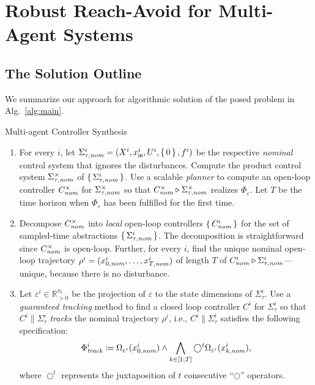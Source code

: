 \section{Robust Reach-Avoid for Multi-Agent Systems}
\subsection{The Solution Outline}
We summarize our approach for algorithmic solution of the posed problem in Alg.~\ref{alg:main}.

\begin{algorithm}
	\caption{Multi-agent Controller Synthesis}
	\label{alg:main}
	\begin{enumerate}
		\item For every $i$, let $\Sigma_{\tau,\mathit{nom}}^i = (X^i,x_{\mathsf{in}}^i,U^i,\set{0},f^i)$ be the respective \emph{nominal} control system that ignores the disturbances.
		Compute the product control system $\Sigma^\times_{\tau,\mathit{nom}}$ of $\set{\Sigma^i_{\tau,\mathit{nom}}}$. 
		Use a scalable \emph{planner} to compute an open-loop controller $C^\times_{\mathit{nom}}$ for $\Sigma^\times_{\tau,\mathit{nom}}$ so that $C^\times_{\mathit{nom}}\triangleright\Sigma_{\tau,\mathit{nom}}^{\times}$ realizes  $\Phi_\varepsilon$.
		Let $T$ be the time horizon when $\Phi_\varepsilon$ has been fulfilled for the first time. \label{step:planning}
		\item Decompose $C^\times_{\mathit{nom}}$ into \emph{local} open-loop controllers $\set{C^i_{\mathit{nom}}}$ for the set of sampled-time abstractions $\set{\Sigma^i_{\tau,\mathit{nom}}}$.
		The decomposition is straightforward since $C^\times_{\mathit{nom}}$ is open-loop. Further, for every $i$, find the unique nominal open-loop trajectory $\rho^i=(x_{0,\mathit{nom}}^i,\ldots,x_{T,\mathit{nom}}^i)$ of length $T$ of $C^i_{\mathit{nom}}\triangleright \Sigma_{\tau,\mathit{nom}}^i$---unique, because there is no disturbance. \label{step:decompose}
		\item Let $\varepsilon^i\in \mathbb{R}^{n_i}_{>0}$ be the projection of $\varepsilon$ to the state dimensions of $\Sigma_{\tau}^i$.
		Use a \emph{guaranteed tracking} method to find a closed loop controller $C^i$ for $\Sigma_{\tau}^i$ so that $C^i\parallel \Sigma_\tau^i$ \emph{tracks} the nominal trajectory $\rho^i$, i.e., $C^i\parallel \Sigma_\tau^i$ satisfies the following specification:
		\begin{align}
			\label{eq:ltl_spec}
			\Phi_{\mathit{track}}^i\coloneqq \Omega_{\varepsilon^i}(x_{0,\mathit{nom}}^i) \wedge \bigwedge_{k\in [1;T]} \bigcirc^t \Omega_{\varepsilon^i}(x_{k,\mathit{nom}}^i),
		\end{align}
		where %
		$\bigcirc^t$ represents the juxtaposition of $t$ consecutive ``$\bigcirc$'' operators.\label{step:tracking}
	\end{enumerate}
\end{algorithm}

